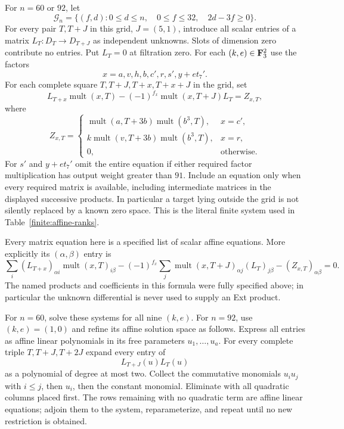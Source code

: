 For $n=60$ or $92$, let
\begin{equation}\label{alg:finite-grid}
 \mathcal G_n=\{(f,d):0\leq d\leq n,\quad 0\leq f\leq32,
                                      \quad2d-3f\geq0\}.
\end{equation}
For every pair $T,T+J$ in this grid, $J=(5,1)$, introduce all scalar
entries of a matrix $L_T:D_T\to D_{T+J}$ as independent unknowns.
Slots of dimension zero contribute no entries.  Put $L_T=0$ at
filtration zero.  For each $(k,e)\in\mathbf F_3^2$ use the factors
\[
 x=a,v,h,b,c',r,s',y+e t_7'.
\]
For each complete square $T,T+J,T+x,T+x+J$ in the grid, set
\begin{equation}\label{alg:leibniz-equations}
 L_{T+x}\operatorname{mult}(x,T)
 -(-1)^{f_x}\operatorname{mult}(x,T+J)L_T=Z_{x,T},
\end{equation}
where
\begin{equation}\label{alg:leibniz-constants}
 Z_{x,T}=
 \begin{cases}
 \operatorname{mult}(a,T+3b)\operatorname{mult}(b^3,T),&x=c',\\
 k\operatorname{mult}(v,T+3b)\operatorname{mult}(b^3,T),&x=r,\\
 0,&\text{otherwise}.
 \end{cases}
\end{equation}
For $s'$ and $y+e t_7'$ omit the entire equation if either required
factor multiplication has output weight greater than $91$.
Include an equation only when every required matrix is available,
including intermediate matrices in the displayed successive products.
In particular a target lying outside the grid is not silently replaced
by a known zero space.  This is the literal finite system used in
Table~\ref{finite:affine-ranks}.

Every matrix equation here is a specified list of scalar affine
equations.  More explicitly its $(\alpha,\beta)$ entry is
\begin{equation}\label{alg:scalar-leibniz}
 \sum_i (L_{T+x})_{\alpha i}
              \operatorname{mult}(x,T)_{i\beta}
 -(-1)^{f_x}\sum_j
              \operatorname{mult}(x,T+J)_{\alpha j}
              (L_T)_{j\beta}-(Z_{x,T})_{\alpha\beta}=0.
\end{equation}
The named products and coefficients in this formula were fully
specified above; in particular the unknown differential is never used
to supply an Ext product.

For $n=60$, solve these systems for all nine $(k,e)$.  For $n=92$, use
$(k,e)=(1,0)$ and refine its affine solution space as follows.  Express
all entries as affine linear polynomials in its free parameters
$u_1,\ldots,u_a$.  For every complete triple $T,T+J,T+2J$ expand every
entry of
\begin{equation}\label{alg:square-polynomials}
 L_{T+J}(u)L_T(u)
\end{equation}
as a polynomial of degree at most two.  Collect the commutative
monomials $u_i u_j$ with $i\leq j$, then $u_i$, then the constant
monomial.  Eliminate with all quadratic columns placed first.  The
rows remaining with no quadratic term are affine linear equations;
adjoin them to the system, reparameterize, and repeat until no new
restriction is obtained.

